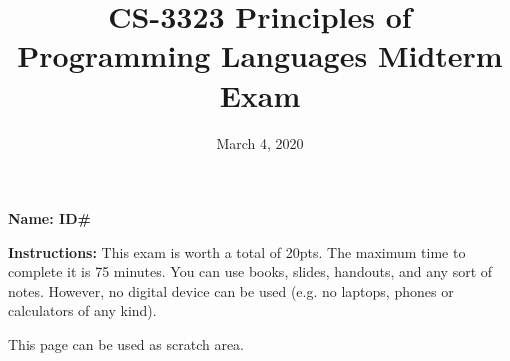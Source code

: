 \documentclass{article}
\title{CS-3323 Principles of Programming Languages Midterm Exam}
\begin{document}
\date{March 4, 2020}

\maketitle
{\bf\large
Name: \underline{\mbox{\hspace{4cm}}} \hfill 
ID\# \underline{\mbox{\hspace{4cm}}}
}

\vspace{0.5cm}
\noindent
{\bf Instructions:}
This exam is worth a total of 20pts. The maximum time to complete it is 75 minutes. You can use books, slides, handouts, and any sort of notes.
However, no digital device can be used (e.g. no laptops, phones or calculators of any kind).
\vspace{0.5cm}



\pagebreak



\pagebreak



\pagebreak

This page can be used as scratch area.
\end{document}
